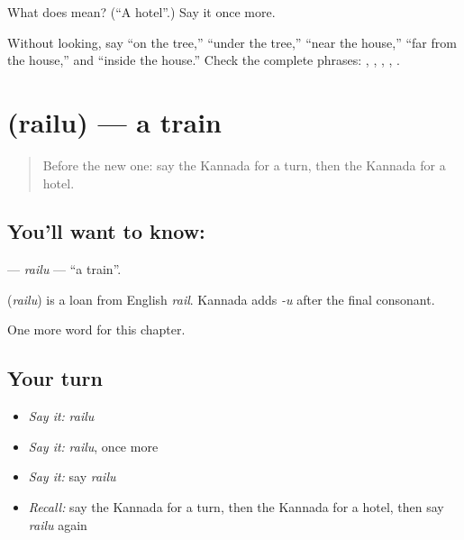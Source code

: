 \begin{tcolorbox}[breakable,colback=teal!4,colframe=teal!35!black,title={Before you move on}]
What does  mean? (\textquotedblleft{}A hotel\textquotedblright{}.) Say it once more.
\end{tcolorbox}

\begin{tcolorbox}[breakable,colback=teal!4,colframe=teal!35!black,title={Before you move on}]
Without looking, say “on the tree,” “under the tree,” “near the house,” “far from the house,” and “inside the house.” Check the complete phrases: \textbf{ }, \textbf{ }, \textbf{ }, \textbf{ }, \textbf{}.
\end{tcolorbox}
\section[\texorpdfstring{\kn{ರೈಲು} (railu)}{ರೈಲು (railu)}]{ (railu) — a train}

\label{lesson:KA-C111-railu}



\begin{quote}
Before the new one: say the Kannada for a turn, then the Kannada for a hotel.
\end{quote}

\subsection*{You'll want to know: }
\textbf{} — \emph{railu} — \textquotedblleft{}a train\textquotedblright{}.

\begin{cousinweb}
\textbf{} (\emph{railu}) is a loan from English \emph{rail}. Kannada adds \emph{-u} after the final consonant.
\end{cousinweb}

\begin{grammarlens}[title={What you've built}]
One more word for this chapter.
\end{grammarlens}

\subsection*{Your turn}
\begin{itemize}
\raggedright
  \item \emph{Say it:} \emph{railu}
  \item \emph{Say it:} \emph{railu}, once more
  \item \emph{Say it:} say \emph{railu}
  \item \emph{Recall:} say the Kannada for a turn, then the Kannada for a hotel, then say \emph{railu} again
\end{itemize}

